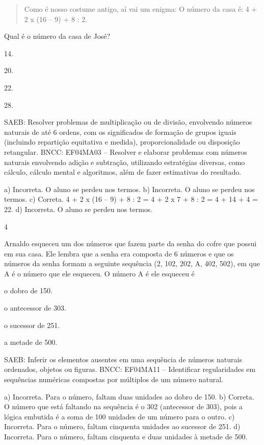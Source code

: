 \begin{mdframed}[linewidth=2pt,linecolor=salmao,roundcorner=2pt]
\begin{escolha}
{\begin{escolha}
\begin{quote}
Como é nosso costume antigo, aí vai um enigma:
O número da casa é: 4 + 2 x (16 -- 9) + 8 : 2.
\end{quote}

Qual é o número da casa de José?

\begin{escolha}
\item
  14.
\item
  20.
\item
  22.
\item
  28.
\end{escolha}

SAEB: Resolver problemas de multiplicação ou de divisão, envolvendo números
naturais de até 6 ordens, com os significados de formação de grupos
iguais (incluindo repartição equitativa e medida), proporcionalidade ou
disposição retangular.
BNCC: EF04MA03 -- Resolver e elaborar problemas com números naturais envolvendo adição e subtração,
utilizando estratégias diversas, como cálculo, cálculo mental e algoritmos, além de fazer estimativas
do resultado.

a) Incorreta. O aluno se perdeu nos termos.
b) Incorreta. O aluno se perdeu nos termos.
c) Correta. 4 + 2 x (16 -- 9) + 8 : 2 = 4 + 2 x 7 + 8 : 2 = 4 + 14 + 4 = 22.
d) Incorreta. O aluno se perdeu nos termos.

\num{4}

Arnaldo esqueceu um dos números que fazem parte da senha do cofre que
possui em sua casa. Ele lembra que a senha era composta de 6 números e
que os números da senha formam a seguinte sequência (2, 102, 202,
A, 402, 502), em que A é o número que ele esqueceu. O número A é
ele esqueceu é

\begin{escolha}
\item
  o dobro de 150.
\item
  o antecessor de 303.
\item
  o sucessor de 251.
\item
  a metade de 500.
\end{escolha}

SAEB: Inferir os elementos ausentes em uma sequência de
números naturais ordenados, objetos ou figuras.
BNCC: EF04MA11 -- Identificar regularidades em sequências numéricas compostas por múltiplos de um
número natural.

a) Incorreta. Para o número, faltam duas unidades ao dobro de 150.
b) Correta. O número que está faltando na sequência é o 302 (antecessor de 303),
pois a lógica embutida é a soma de 100 unidades de um número para o
outro.
c) Incorreta. Para o número, faltam cinquenta unidades ao sucessor de 251.
d) Incorreta. Para o número, faltam cinquenta e duas unidades à metade de 500.


\end{escolha}}
\end{escolha}
\end{mdframed}
